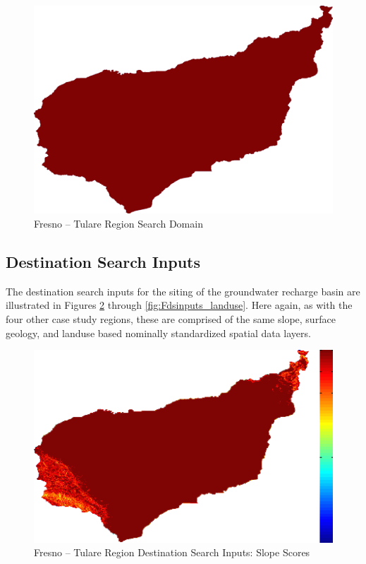         \begin{figure}[!h]
            \begin{center}
            \includegraphics[width=5.5in]{figures/Fresno_SearchDomain.png}   
            \caption{Fresno -- Tulare Region Search Domain}
            \label{fig:Fdomain}
            \end{center}
        \end{figure}
        
    \subsection{Destination Search Inputs}
    
The destination search inputs for the siting of the groundwater recharge basin are illustrated in Figures \ref{fig:Fdsinputs_slope} through \ref{fig:Fdsinputs_landuse}. Here again, as with the four other case study regions, these are comprised of the same slope, surface geology, and landuse based nominally standardized spatial data layers.
    
        \begin{figure}[!h]
            \begin{center}
            \includegraphics[width=5.5in]{figures/Fresno_Search_Slope.png}   
            \caption{Fresno -- Tulare Region Destination Search Inputs: Slope Scores}
            \label{fig:Fdsinputs_slope}
            \end{center}
        \end{figure}
        
